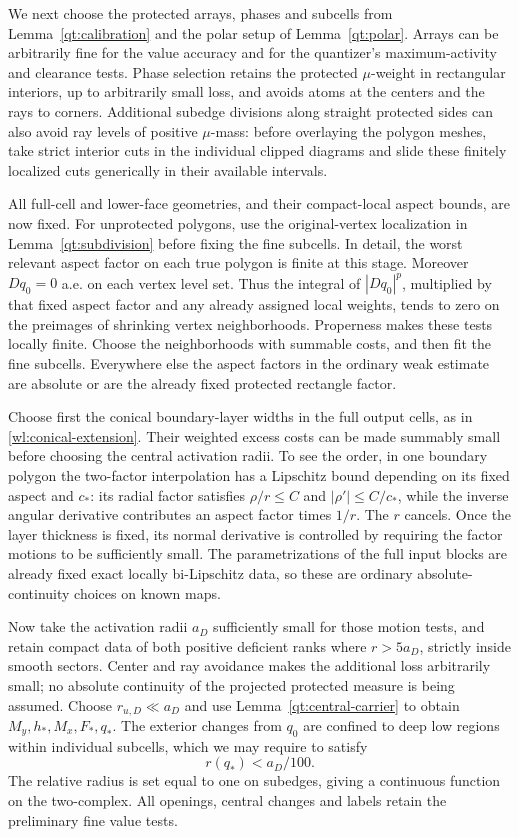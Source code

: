 \documentclass[11pt]{article}
\numberwithin{equation}{section}
\theoremstyle{definition}
\theoremstyle{remark}
\begin{document}
We next choose the protected arrays, phases and subcells from
Lemma~\ref{qt:calibration} and the polar setup of
Lemma~\ref{qt:polar}.  Arrays can be arbitrarily fine for the value
accuracy and for the quantizer's maximum-activity and clearance tests.
Phase selection retains the protected $\mu$-weight in rectangular
interiors, up to arbitrarily small loss, and avoids atoms at the
centers and the rays to corners.  Additional subedge divisions along
straight protected sides can also avoid ray levels of positive
$\mu$-mass: before overlaying the polygon meshes, take strict interior
cuts in the individual clipped diagrams and slide these finitely
localized cuts generically in their available intervals.

All full-cell and lower-face geometries, and their compact-local
aspect bounds, are now fixed.  For unprotected polygons, use the
original-vertex localization in Lemma~\ref{qt:subdivision} before
fixing the fine subcells.  In detail, the worst relevant aspect factor
on each true polygon is finite at this stage.  Moreover $Dq_0=0$ a.e.
on each vertex level set.  Thus the integral of $|Dq_0|^p$, multiplied
by that fixed aspect factor and any already assigned local weights,
tends to zero on the preimages of shrinking vertex neighborhoods.
Properness makes these tests locally finite.  Choose the neighborhoods
with summable costs, and then fit the fine subcells.  Everywhere else
the aspect factors in the ordinary weak estimate are absolute or
are the already fixed protected rectangle factor.

Choose first the conical boundary-layer widths in the full output
cells, as in \eqref{wl:conical-extension}.  Their weighted excess
costs can be made summably small before choosing the central activation
radii.  To see the order, in one boundary polygon the two-factor
interpolation has a Lipschitz bound depending on its fixed aspect and
$c_*$: its radial factor satisfies $\rho/r\le C$ and
$|\rho'|\le C/c_*$, while the inverse angular derivative contributes
an aspect factor times $1/r$.  The $r$ cancels.  Once the layer
thickness is fixed, its normal derivative is controlled by requiring
the factor motions to be sufficiently small.  The parametrizations
of the full input blocks are already fixed exact locally bi-Lipschitz
data, so these are ordinary absolute-continuity choices on known
maps.

Now take the activation radii $a_D$ sufficiently small for those
motion tests, and retain compact data of both positive deficient
ranks where $r>5a_D$, strictly inside smooth sectors.  Center and ray
avoidance makes the additional loss arbitrarily small; no absolute
continuity of the projected protected measure is being assumed.
Choose $r_{u,D}\ll a_D$ and use
Lemma~\ref{qt:central-carrier} to obtain
$M_y,h_*,M_x,F_*,q_*$.  The exterior changes from $q_0$ are confined
to deep low regions within individual subcells, which we may require
to satisfy
\begin{equation}\label{ha:deep-changes}
                         r(q_*)<a_D/100.
\end{equation}
The relative radius is set equal to one on subedges, giving a
continuous function on the two-complex.  All openings, central changes
and labels retain the preliminary fine value tests.
\end{document}
